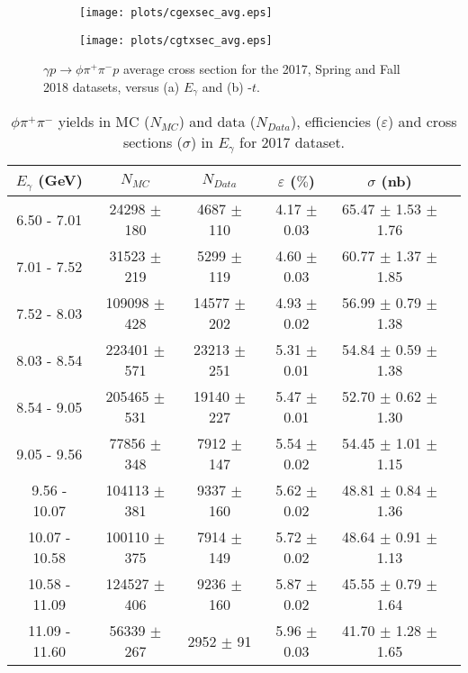 \begin{center}
    \null
    \vfill
\begin{figure}[H]
    \centering
    \begin{subfigure}[b]{0.5\textwidth}
        \texttt{[image: plots/cgexsec\_avg.eps]}
        \caption{}
        \label{fig.xsec_ul.phi2pi.11.a}
    \end{subfigure}\hfill
    \begin{subfigure}[b]{0.5\textwidth}
        \texttt{[image: plots/cgtxsec\_avg.eps]}
        \caption{}
        \label{fig.xsec_ul.phi2pi.11.b}
    \end{subfigure}
    \caption{\label{fig.xsec_ul.phi2pi.11}$\gamma p \rightarrow \phi \pi^{+} \pi^{-} p$ average cross section for the 2017, Spring and Fall 2018 datasets, versus (a) $E_{\gamma}$ and (b) -$t$.}
\end{figure}
\null
\vfill
\end{center}

\newpage
\begin{center}
\null
\vfill
\begin{table}[H]
    \caption{$\phi \pi^{+}\pi^{-}$ yields in MC ($N_{MC}$) and data ($N_{Data}$), efficiencies ($\varepsilon$) and cross sections ($\sigma$) in $E_{\gamma}$ for 2017 dataset.}
    \label{tab.xsec_ul.phi2pi.2.1}
    \begin{tabular}{|c|c|c|c|c|c|}
    \hline
    $E_{\gamma}$ (GeV) & $N_{MC}$ & $N_{Data}$ & $\varepsilon$ ($\%$) & $\sigma$ (nb) \\ 
    \hline
    6.50 - 7.01 & 24298 $\pm$ 180 & 4687 $\pm$ 110 & 4.17 $\pm$ 0.03 & 65.47 $\pm$ 1.53 $\pm$ 1.76 \\ 
    7.01 - 7.52 & 31523 $\pm$ 219 & 5299 $\pm$ 119 & 4.60 $\pm$ 0.03 & 60.77 $\pm$ 1.37 $\pm$ 1.85 \\ 
    7.52 - 8.03 & 109098 $\pm$ 428 & 14577 $\pm$ 202 & 4.93 $\pm$ 0.02 & 56.99 $\pm$ 0.79 $\pm$ 1.38 \\ 
    8.03 - 8.54 & 223401 $\pm$ 571 & 23213 $\pm$ 251 & 5.31 $\pm$ 0.01 & 54.84 $\pm$ 0.59 $\pm$ 1.38 \\ 
    8.54 - 9.05 & 205465 $\pm$ 531 & 19140 $\pm$ 227 & 5.47 $\pm$ 0.01 & 52.70 $\pm$ 0.62 $\pm$ 1.30 \\ 
    9.05 - 9.56 & 77856 $\pm$ 348 & 7912 $\pm$ 147 & 5.54 $\pm$ 0.02 & 54.45 $\pm$ 1.01 $\pm$ 1.15 \\ 
    9.56 - 10.07 & 104113 $\pm$ 381 & 9337 $\pm$ 160 & 5.62 $\pm$ 0.02 & 48.81 $\pm$ 0.84 $\pm$ 1.36 \\ 
    10.07 - 10.58 & 100110 $\pm$ 375 & 7914 $\pm$ 149 & 5.72 $\pm$ 0.02 & 48.64 $\pm$ 0.91 $\pm$ 1.13 \\ 
    10.58 - 11.09 & 124527 $\pm$ 406 & 9236 $\pm$ 160 & 5.87 $\pm$ 0.02 & 45.55 $\pm$ 0.79 $\pm$ 1.64 \\ 
    11.09 - 11.60 & 56339 $\pm$ 267 & 2952 $\pm$ 91 & 5.96 $\pm$ 0.03 & 41.70 $\pm$ 1.28 $\pm$ 1.65 \\ 
   \hline
\end{tabular}
\end{table}
\end{center}

